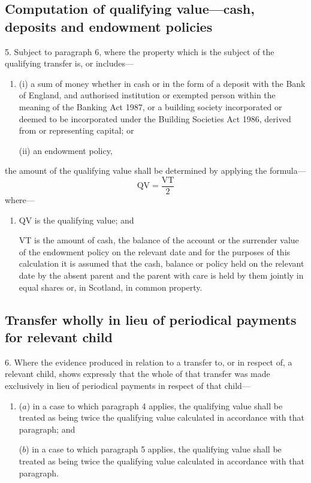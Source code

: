 \documentclass[12pt,a4paper]{article}
\begin{document}
\subsection*{Computation of qualifying value—cash, deposits and endowment policies}

5.  Subject to paragraph 6, where the property which is the subject of the qualifying transfer is, or includes—
\begin{enumerate}\item[]
(i) a sum of money whether in cash or in the form of a deposit with the Bank of England, and authorised institution or exempted person within the meaning of the Banking Act 1987, or a building society incorporated or deemed to be incorporated under the Building Societies Act 1986, derived from or representing capital; or

(ii) an endowment policy,
\end{enumerate}
the amount of the qualifying value shall be determined by applying the formula—
\[ \mathrm{QV} = \frac{\mathrm{VT}}{2}\]
where—
\begin{enumerate}\item[]
QV is the qualifying value; and

VT is the amount of cash, the balance of the account or the surrender value of the endowment policy on the relevant date
and for the purposes of this calculation it is assumed that the cash, balance or policy held on the relevant date by the absent parent and the parent with care is held by them jointly in equal shares or, in Scotland, in common property.  %
\end{enumerate}


\subsection*{\sloppy Transfer wholly in lieu of periodical payments for relevant child}

6.  Where the evidence produced in relation to a transfer to, or in respect of, a relevant child, shows expressly that the whole of that transfer was made exclusively in lieu of periodical payments in respect of that child—
\begin{enumerate}\item[]
($a$) in a case to which paragraph 4 applies, 
the qualifying value shall be treated as being twice the qualifying value calculated in accordance with that paragraph;  %
and

($b$) in a case to which paragraph 5 applies, the qualifying value shall be 
treated as being twice the qualifying value calculated in accordance with that paragraph.  %
\end{enumerate}
\end{document}
